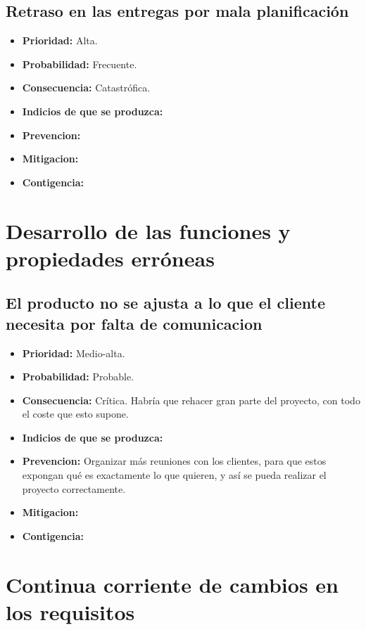 \documentclass[spanish,a4paper,12pt]{report}	%
\begin{document}
\subsection*{Retraso en las entregas por mala planificación}			%
	\begin{itemize}
		\item \textbf {Prioridad: }Alta.
		\item \textbf {Probabilidad: }Frecuente.
		\item \textbf {Consecuencia: }Catastrófica.
		\item \textbf {Indicios de que se produzca: }
		\item \textbf {Prevencion: }
		\item \textbf {Mitigacion: }
		\item \textbf {Contigencia: }
	\end{itemize}

%
\section{Desarrollo de las funciones y propiedades erróneas}
\subsection*{El producto no se ajusta a lo que el cliente necesita por falta de comunicacion}			%
	\begin{itemize}
		\item \textbf {Prioridad: }Medio-alta.
		\item \textbf {Probabilidad: }Probable.
		\item \textbf {Consecuencia: }Crítica. Habría que rehacer gran parte del proyecto, con todo el coste que esto supone.
		\item \textbf {Indicios de que se produzca: }
		\item \textbf {Prevencion: }Organizar más reuniones con los clientes, para que estos expongan qué es exactamente lo que quieren, y así se pueda realizar el proyecto correctamente. 
		\item \textbf {Mitigacion: }
		\item \textbf {Contigencia: }
	\end{itemize}

%
\section{Continua corriente de cambios en los requisitos}
\end{document}
